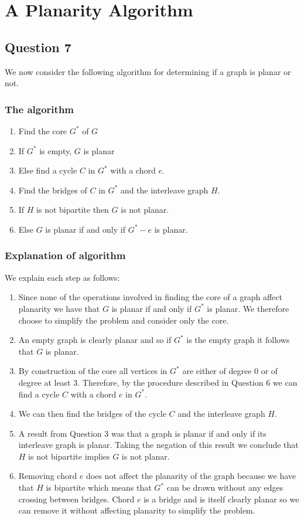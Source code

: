 \documentclass[a4paper]{article}
\begin{document}
\section*{A Planarity Algorithm}

\subsection*{Question 7}
We now consider the following algorithm for determining if a graph is planar or not.

\subsubsection*{The algorithm}
\begin{enumerate}
    \item Find the core $G^*$ of $G$
    \item If $G^*$ is empty, $G$ is planar
    \item Else find a cycle $C$ in $G^*$ with a chord $e$.
    \item Find the bridges of $C$ in $G^*$ and the interleave graph $H$.
    \item If $H$ is not bipartite then $G$ is not planar.
    \item Else $G$ is planar if and only if $G^*-e$ is planar.
\end{enumerate}

\subsubsection*{Explanation of algorithm}
We explain each step as follows:
\begin{enumerate}
    \item 
    Since none of the operations involved in finding the core of a graph affect planarity we have that $G$ is planar if and only if $G^*$ is planar. We therefore choose to simplify the problem and consider only the core.
    \item
    An empty graph is clearly planar and so if $G^*$ is the empty graph it follows that $G$ is planar.
    \item
    By construction of the core all vertices in $G^*$ are either of degree 0 or of degree at least 3. Therefore, by the procedure described in Question 6 we can find a cycle $C$ with a chord $e$ in $G^*$.
    \item
    We can then find the bridges of the cycle $C$ and the interleave graph $H$.
    \item
    A result from Question 3 was that a graph is planar if and only if its interleave graph is planar. Taking the negation of this result we conclude that $H$ is not bipartite implies $G$ is not planar.
    \item
    Removing chord $e$ does not affect the planarity of the graph because we have that $H$ is bipartite which means that $G^*$ can be drawn without any edges crossing between bridges. Chord $e$ is a bridge and is itself clearly planar so we can remove it without affecting planarity to simplify the problem.
\end{enumerate}
\end{document}
